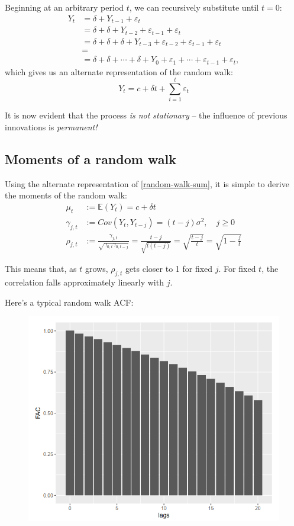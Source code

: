 \documentclass[11pt, a4paper]{report}
\theoremstyle{plain}
\theoremstyle{plain}
\theoremstyle{remark}
\begin{document}
Beginning at an arbitrary period $t$, we can recursively substitute until $t=0$:
$$\begin{aligned}
	Y_{t} &=\delta+Y_{t-1}+\varepsilon_{t} \\
	&=\delta+\delta+Y_{t-2}+\varepsilon_{t-1}+\varepsilon_{t} \\
	&=\delta+\delta+\delta+Y_{t-3}+\varepsilon_{t-2}+\varepsilon_{t-1}+\varepsilon_{t} \\
	&=\\
	&=\delta+\delta+\cdots+\delta+Y_{0}+\varepsilon_{1}+\cdots+\varepsilon_{t-1}+\varepsilon_{t},
\end{aligned}$$
which gives us an alternate representation of the random walk:
\begin{equation} 
	\label{random-walk-sum}
	Y_t = c + \delta t + \sum_{i=1}^{t} \varepsilon_{t}
\end{equation}

It is now evident that the process \textit{is not stationary} -- the influence of previous innovations is \textit{permanent!}

\subsection{Moments of a random walk}

Using the alternate representation of \ref{random-walk-sum}, it is simple to derive the moments of the random walk:
$$\begin{aligned}
	\mu_{t} &:=\mathbb{E}\left(Y_{t}\right)=c+\delta t \\
	\gamma_{j, t} &:=Cov\left(Y_{t}, Y_{t-j}\right)=(t-j) \sigma^{2}, \quad j \geq 0 \\
	\rho_{j, t} &:=\frac{\gamma_{j, t}}{\sqrt{\gamma_{0, t} \gamma_{0, t-j}}}=\frac{t-j}{\sqrt{t(t-j)}}=\sqrt{\frac{t-j}{t}}=\sqrt{1-\frac{j}{t}}
\end{aligned}$$

This means that, as $t$ grows, $\rho_{j,t}$ gets closer to 1 for fixed $j$. For fixed $t$, the correlation falls approximately linearly with $j$.

Here's a typical random walk ACF:

\begin{figure}
	\centering
	\includegraphics[width=0.6\linewidth]{"fac random walk"}
	\label{fig:fac-random-walk}
\end{figure}
\end{document}
